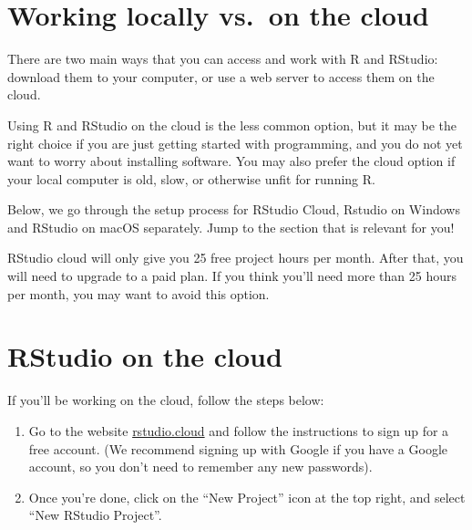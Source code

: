\documentclass[
  letterpaper,
  DIV=11,
  numbers=noendperiod]{scrreprt}
\begin{document}
\hypertarget{working-locally-vs.-on-the-cloud}{%
\section{Working locally vs.~on the
cloud}\label{working-locally-vs.-on-the-cloud}}

There are two main ways that you can access and work with R and RStudio:
download them to your computer, or use a web server to access them on
the cloud.

Using R and RStudio on the cloud is the less common option, but it may
be the right choice if you are just getting started with programming,
and you do not yet want to worry about installing software. You may also
prefer the cloud option if your local computer is old, slow, or
otherwise unfit for running R.

Below, we go through the setup process for RStudio Cloud, Rstudio on
Windows and RStudio on macOS separately. Jump to the section that is
relevant for you!

\begin{tcolorbox}[enhanced jigsaw, colframe=quarto-callout-caution-color-frame, rightrule=.15mm, opacityback=0, breakable, coltitle=black, colbacktitle=quarto-callout-caution-color!10!white, bottomrule=.15mm, leftrule=.75mm, toprule=.15mm, arc=.35mm, bottomtitle=1mm, colback=white, left=2mm, opacitybacktitle=0.6, titlerule=0mm, title=\textcolor{quarto-callout-caution-color}{\faFire}\hspace{0.5em}{Watch Out}, toptitle=1mm]

RStudio cloud will only give you 25 free project hours per month. After
that, you will need to upgrade to a paid plan. If you think you'll need
more than 25 hours per month, you may want to avoid this option.

\end{tcolorbox}

\hypertarget{rstudio-on-the-cloud}{%
\section{RStudio on the cloud}\label{rstudio-on-the-cloud}}

If you'll be working on the cloud, follow the steps below:

\begin{enumerate}
\def\labelenumi{\arabic{enumi}.}
\item
  Go to the website \href{https://rstudio.cloud}{rstudio.cloud} and
  follow the instructions to sign up for a free account. (We recommend
  signing up with Google if you have a Google account, so you don't need
  to remember any new passwords).
\item
  Once you're done, click on the ``New Project'' icon at the top right,
  and select ``New RStudio Project''.
\end{enumerate}
\end{document}
